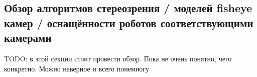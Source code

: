 \subsection{Обзор алгоритмов стереозрения / моделей fisheye камер / оснащённости роботов соответствующими камерами}

TODO: в этой секции стоит провести обзор. Пока не очень понятно, чего конкретно. Можно наверное и всего понемногу